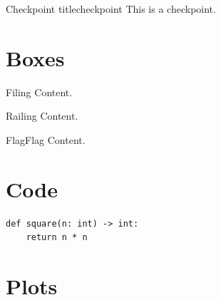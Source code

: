 \documentclass{article}
\begin{document}
\begin{checkpoint}{Checkpoint title}{checkpoint}
  This is a checkpoint.
\end{checkpoint}

\section{Boxes}

\begin{filingbox}{Filing}
  Content.
\end{filingbox}

\begin{railingbox}{Railing}
  Content.
\end{railingbox}

\begin{flagbox}{Flag}{Flag}
  Content.
\end{flagbox}

\section{Code}

\begin{verbatim}
def square(n: int) -> int:
    return n * n
\end{verbatim}

\section{Plots}

\end{document}
